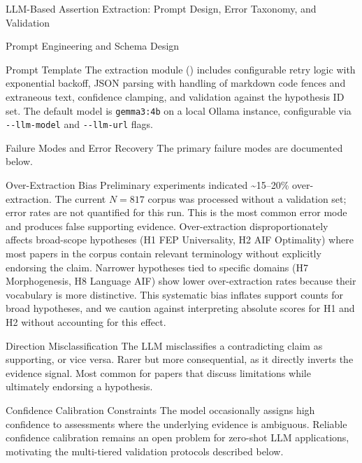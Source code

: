 \documentclass[
  ignorenonframetext,
]{beamer}
\begin{document}
\begin{frame}{LLM-Based Assertion Extraction:
Prompt Design, Error Taxonomy, and Validation
\label{sec:extraction_pipeline}}
\begin{block}{Prompt Engineering and Schema Design}
\begin{block}{Prompt Template}
The extraction module ()
includes configurable retry logic with exponential backoff, JSON parsing
with handling of markdown code fences and extraneous text, confidence
clamping, and validation against the hypothesis ID set. The default
model is \texttt{gemma3:4b} on a local Ollama instance, configurable via
\texttt{-\/-llm-model} and \texttt{-\/-llm-url} flags.
\end{block}
\end{block}

\begin{block}{Failure Modes and Error Recovery}
\protect{}\label{failure-modes-and-error-recovery}
The primary failure modes are documented below.

\begin{block}{Over-Extraction Bias}
\protect{}\label{over-extraction-bias}
Preliminary experiments indicated \textasciitilde15--20\%
over-extraction. The current \(N = 817\) corpus was processed without a
validation set; error rates are not quantified for this run. This is the
most common error mode and produces false supporting evidence.
Over-extraction disproportionately affects broad-scope hypotheses (H1
FEP Universality, H2 AIF Optimality) where most papers in the corpus
contain relevant terminology without explicitly endorsing the claim.
Narrower hypotheses tied to specific domains (H7 Morphogenesis, H8
Language AIF) show lower over-extraction rates because their vocabulary
is more distinctive. This systematic bias inflates support counts for
broad hypotheses, and we caution against interpreting absolute scores
for H1 and H2 without accounting for this effect.
\end{block}

\begin{block}{Direction Misclassification}
\protect{}\label{direction-misclassification}
The LLM misclassifies a contradicting claim as supporting, or vice
versa. Rarer but more consequential, as it directly inverts the evidence
signal. Most common for papers that discuss limitations while ultimately
endorsing a hypothesis.
\end{block}

\begin{block}{Confidence Calibration Constraints}
\protect{}\label{confidence-calibration-constraints}
The model occasionally assigns high confidence to assessments where the
underlying evidence is ambiguous. Reliable confidence calibration
remains an open problem for zero-shot LLM applications, motivating the
multi-tiered validation protocols described below.
\end{block}


\end{block}
\end{frame}
\end{document}
